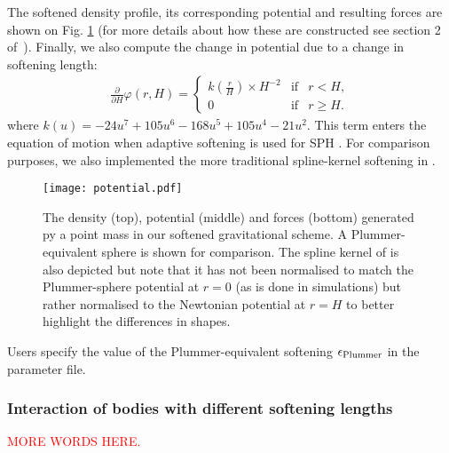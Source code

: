 The softened density profile, its corresponding potential and
resulting forces are shown on Fig. \ref{fig:fmm:softening} (for more
details about how these are constructed see section 2
of~\cite{Price2007}). Finally, we also compute the change in potential
due to a change in softening length:
\begin{align}
\frac{\partial}{\partial H}\varphi(r,H) = 
\left\lbrace\begin{array}{rcl}
k(\frac{r}{H}) \times H^{-2} & \mbox{if} & r < H,\\
0 & \mbox{if} & r \geq H.
\end{array}
\right.
\label{eq:fmm:potential_h_derivative}
\end{align}
where $k(u)=-24u^7+105u^6-168u^5+105u^4-21u^2$. This term enters the
equation of motion when adaptive softening is used for SPH
\citep[e.g.][]{Price2007}. For comparison purposes, we also implemented the
more traditional spline-kernel softening in \swift.
\begin{figure}
\texttt{[image: potential.pdf]}
\caption{The density (top), potential (middle) and forces (bottom)
  generated py a point mass in our softened gravitational scheme.  A
  Plummer-equivalent sphere is shown for comparison. The spline kernel
  of \citet{Monaghan1985} is also depicted but note that it has not
  been normalised to match the Plummer-sphere potential at $r=0$ (as
  is done in simulations) but rather normalised to the Newtonian
  potential at $r=H$ to better highlight the differences in shapes.}
\label{fig:fmm:softening}
\end{figure}
Users specify the value of the Plummer-equivalent softening
$\epsilon_{\rm Plummer}$ in the parameter file.

\subsubsection{Interaction of bodies with different softening lengths}

\textcolor{red}{MORE WORDS HERE.}\\
